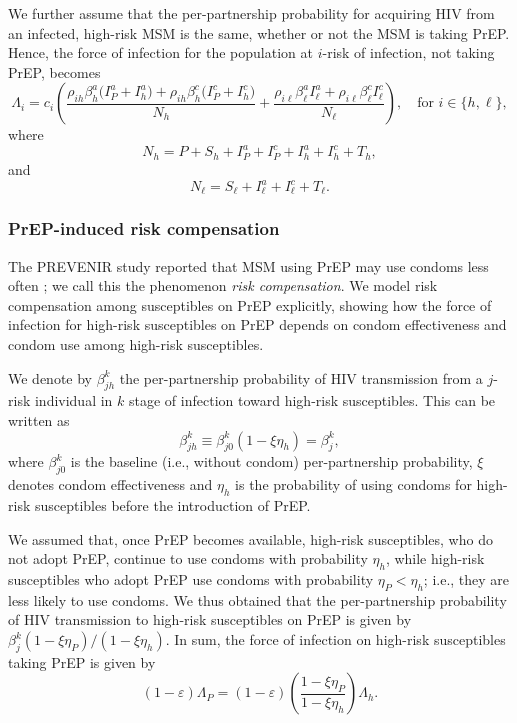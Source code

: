 \documentclass[12pt]{article}
\begin{document}
We further assume that the per-partnership probability for acquiring HIV from an infected, high-risk MSM is the same, whether or not the MSM is taking PrEP. Hence, the force of infection for the population at $i$-risk of infection, not taking PrEP, becomes
\begin{equation}
	\Lambda_i	 = c_i \left( \frac{\rho_{ih} \beta_h^a \big(I_P^a + I_h^a\big) + \rho_{ih} \beta_h^c \big(I_P^c +I_h^c \big)}{N_h} + \frac{\rho_{i\ell} \beta_\ell^a I_\ell^a + \rho_{i\ell} \beta_\ell^c I_\ell^c}{N_\ell}\right), \quad \text{for } i \in\{h,\ell\},
\end{equation}
where
\begin{equation}
N_h = P + S_h + I_P^a + I_P^c + I_h^a + I_h^c + T_h,
\end{equation}
and
\begin{equation}
N_\ell = S_\ell + I_\ell^ a + I_\ell^c + T_\ell.
\end{equation}


\subsubsection{PrEP-induced risk compensation} \label{sec:RiskCompensation}

The PREVENIR study reported that MSM using PrEP may use condoms less often \cite{Molina2018}; we call this the phenomenon \textit{risk compensation}. We model risk compensation among susceptibles on PrEP explicitly, showing how the force of infection for high-risk susceptibles on PrEP depends on condom effectiveness and condom use among high-risk susceptibles.

We denote by $\beta_{jh}^k$ the per-partnership probability of HIV transmission from a $j$-risk individual in $k$ stage of infection toward high-risk susceptibles. This can be written as
 \begin{equation}
 	\beta_{jh}^k \equiv \beta_{j 0}^k(1-\xi \eta_h) = \beta_j^k,
 \end{equation}
where $\beta_{j 0}^k$ is the baseline (i.e., without condom) per-partnership probability, $\xi$ denotes condom effectiveness and $\eta_h$ is the probability of using condoms for high-risk susceptibles before the introduction of PrEP.

We assumed that, once PrEP becomes available, high-risk susceptibles, who do not adopt PrEP, continue to use condoms with probability $\eta_h$, while high-risk susceptibles who adopt PrEP use condoms with probability $\eta_P < \eta_h$; i.e., they are less likely to use condoms. We thus obtained that the per-partnership probability of HIV transmission to high-risk susceptibles on PrEP is given by $\beta_j^k (1-\xi \eta_P)/(1-\xi \eta_h)$. In sum, the force of infection on high-risk susceptibles taking PrEP is given by
\begin{equation}
	(1-\varepsilon) \Lambda_P = (1-\varepsilon) \left(\frac{1-\xi \eta_P}{1-\xi \eta_h}\right) \Lambda_h.
\end{equation}
\end{document}
